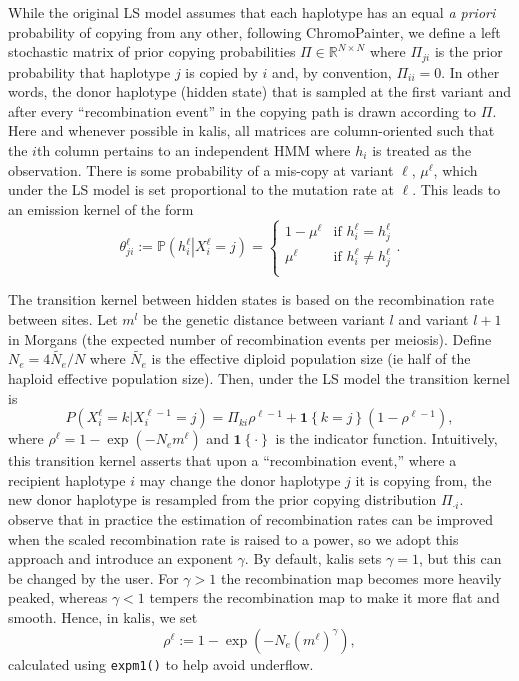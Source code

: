 \documentclass[pdflatex,referee,lineno,sn-nature]{sn-jnl}%
\newcommand{\pkg}[1]{{\fontseries{m}\fontseries{b}\selectfont #1}}
\begin{document}
While the original LS model assumes that each haplotype has an equal \emph{a priori} probability of copying from any other, following ChromoPainter, we define a left stochastic matrix of prior copying probabilities \(\Pi \in \mathbb{R}^{N \times N}\) where \(\Pi_{ji}\) is the prior probability that haplotype \(j\) is copied by \(i\) and, by convention, \(\Pi_{ii} = 0\).
In other words, the donor haplotype (hidden state) that is sampled at the first variant and after every ``recombination event'' in the copying path is drawn according to \(\Pi\).
Here and whenever possible in \pkg{kalis}, all matrices are column-oriented such that the \(i\)th column pertains to an independent HMM where \(h_i\) is treated as the observation.
There is some probability of a mis-copy at variant \(\ell\), \(\mu^{\ell}\), which under the LS model is set proportional to the mutation rate at \(\ell\).
This leads to an emission kernel of the form
\begin{equation}
	\theta_{ji}^{\ell} := \mathbb{P}\left(h_{i}^\ell \left| X_{i}^{\ell} = j \right. \right)
	= \begin{cases}
		1 - \mu^{\ell} & \text{if } h_{i}^\ell = h_j^\ell \\
		\mu^{\ell} & \text{if } h_{i}^\ell \neq h_j^\ell \\
	\end{cases} .
	\label{eq:emission}
\end{equation}

The transition kernel between hidden states is based on the recombination rate between sites.
Let \(m^l\) be the genetic distance between variant \(l\) and variant \(l+1\) in Morgans (the expected number of recombination events per meiosis).
Define \(N_e = 4\tilde{N_e}/N\) where \(\tilde{N_e}\) is the effective diploid population size (ie half of the haploid effective population size).
Then, under the LS model the transition kernel is
\begin{equation}
	P(X_{i}^\ell = k | X_{i}^{\ell-1} = j)
	= \Pi_{ki} \rho^{\ell-1} + \mathbf{1}\left\{k = j\right\} \left(1-\rho^{\ell-1}\right) ,
	\label{eq:transition}
\end{equation}
where \(\rho^\ell = 1-\exp\left(-N_e m^\ell\right)\) and \(\mathbf{1}\left\{\cdot\right\}\) is the indicator function.
Intuitively, this transition kernel asserts that upon a ``recombination event,'' where a recipient haplotype $i$ may change the donor haplotype $j$ it is copying from, the new donor haplotype is resampled from the prior copying distribution $\Pi_{\cdot i}$.
\cite[Appendix B]{Li2213} observe that in practice the estimation of recombination rates can be improved when the scaled recombination rate is raised to a power, so we adopt this approach and introduce an exponent \(\gamma\).
By default, \pkg{kalis} sets \(\gamma = 1\), but this can be changed by the user.
For \(\gamma>1\) the recombination map becomes more heavily peaked, whereas \(\gamma<1\) tempers the recombination map to make it more flat and smooth.
Hence, in \pkg{kalis}, we set
\begin{equation}
	\rho^\ell := 1-\exp\left(-N_e \left(m^\ell\right)^\gamma\right), \label{eq:rho}
\end{equation}
calculated using \texttt{expm1()} to help avoid underflow.
\end{document}
